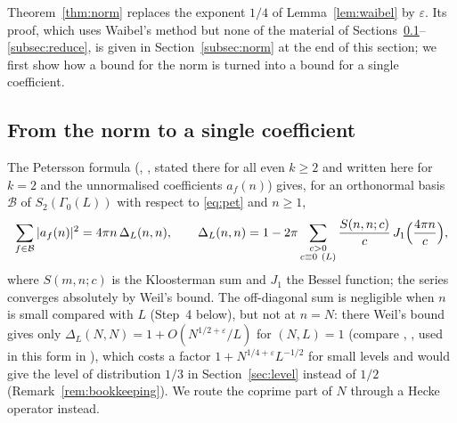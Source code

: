 \documentclass[11pt]{amsart}
\theoremstyle{remark}
\newcommand{\e}{\varepsilon}
\begin{document}
Theorem~\ref{thm:norm} replaces the exponent $1/4$ of Lemma~\ref{lem:waibel} by $\e$. Its proof, which uses Waibel's method but none of the material of Sections~\ref{subsec:hecke}--\ref{subsec:reduce}, is given in Section~\ref{subsec:norm} at the end of this section; we first show how a bound for the norm is turned into a bound for a single coefficient.

\subsection{From the norm to a single coefficient}\label{subsec:hecke}
The Petersson formula (\cite[Prop.~2.1]{ILS}, \cite[Prop.~14.5]{IK}, stated there for all even $k\ge2$ and written here for $k=2$ and the unnormalised coefficients $a_f(n)$) gives, for an orthonormal basis $\mathcal B$ of $S_2(\Gamma_0(L))$ with respect to \eqref{eq:pet} and $n\ge1$,
\begin{equation}\label{eq:petersson}
\sum_{f\in\mathcal B}|a_f(n)|^2=4\pi n\,\Delta_L(n,n),\qquad
\Delta_L(n,n)=1-2\pi\sum_{\substack{c>0\\ c\equiv0\ (L)}}\frac{S(n,n;c)}{c}\,J_1\Bigl(\frac{4\pi n}{c}\Bigr),
\end{equation}
where $S(m,n;c)$ is the Kloosterman sum and $J_1$ the Bessel function; the series converges absolutely by Weil's bound. The off-diagonal sum is negligible when $n$ is small compared with $L$ (Step~4 below), but not at $n=N$: there Weil's bound gives only $\Delta_L(N,N)=1+O(N^{1/2+\e}/L)$ for $(N,L)=1$ (compare \cite[Cor.~2.2]{ILS}, \cite[Cor.~14.24]{IK}, used in this form in \cite[(3)]{Waibel}), which costs a factor $1+N^{1/4+\e}L^{-1/2}$ for small levels and would give the level of distribution $1/3$ in Section~\ref{sec:level} instead of $1/2$ (Remark~\ref{rem:bookkeeping}). We route the coprime part of $N$ through a Hecke operator instead.
\end{document}
